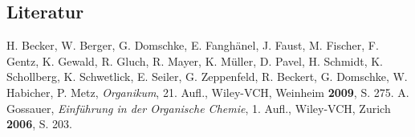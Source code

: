 \documentclass[12pt]{article}
\begin{document}
\begin{onehalfspace}
\section{Literatur}
\renewcommand{\section}[2]{}%
\begin{thebibliography}{}
H. Becker, W. Berger, G. Domschke, E. Fanghänel, J. Faust, M. Fischer, F. Gentz, K. Gewald, R. Gluch, R. Mayer, K. Müller, D. Pavel, H. Schmidt,  K. Schollberg, K. Schwetlick, E. Seiler, G. Zeppenfeld, R. Beckert, G. Domschke, W. Habicher, P. Metz, \textit{Organikum},  21. Aufl., Wiley-VCH, Weinheim \textbf{2009}, S. 275. 
A. Gossauer, \textit{Einführung in der Organische Chemie}, 1. Aufl., Wiley-VCH, Zurich \textbf{2006}, S. 203.
\end{thebibliography}

\end{onehalfspace}
\end{document}

